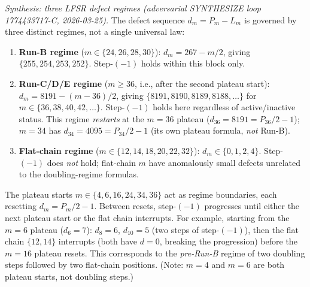 \documentclass[11pt]{article}
\theoremstyle{plain}
\theoremstyle{definition}
\begin{document}
\emph{Synthesis: three LFSR defect regimes (adversarial SYNTHESIZE loop 1774433717-C, 2026-03-25).}
The defect sequence $d_m = P_m - L_m$ is governed by three distinct regimes, not a single
universal law:
\begin{enumerate}
\item \textbf{Run-B regime} ($m\in\{24,26,28,30\}$): $d_m = 267 - m/2$, giving
  $\{255,254,253,252\}$.  Step-$(-1)$ holds within this block only.
\item \textbf{Run-C/D/E regime} ($m\geq 36$, i.e., after the second plateau start):
  $d_m = 8191 - (m-36)/2$, giving $\{8191,8190,8189,8188,\ldots\}$ for $m\in\{36,38,40,42,\ldots\}$.
  Step-$(-1)$ holds here regardless of active/inactive status.
  This regime \emph{restarts} at the $m=36$ plateau ($d_{36}=8191=P_{36}/2-1$);
  $m=34$ has $d_{34}=4095=P_{34}/2-1$ (its own plateau formula, \emph{not} Run-B).
\item \textbf{Flat-chain regime} ($m\in\{12,14,18,20,22,32\}$): $d_m\in\{0,1,2,4\}$.
  Step-$(-1)$ does \emph{not} hold; flat-chain $m$ have anomalously small defects
  unrelated to the doubling-regime formulas.
\end{enumerate}
The plateau starts $m\in\{4,6,16,24,34,36\}$ act as regime boundaries, each resetting
$d_m = P_m/2-1$.  Between resets, step-$(-1)$ progresses until either the next plateau start
or the flat chain interrupts.  For example, starting from the $m=6$ plateau ($d_6=7$):
$d_8=6$, $d_{10}=5$ (two steps of step-$(-1)$), then the flat chain $\{12,14\}$ interrupts
(both have $d=0$, breaking the progression) before the $m=16$ plateau resets.
This corresponds to the \emph{pre-Run-B} regime of two doubling steps followed by two
flat-chain positions.  (Note: $m=4$ and $m=6$ are both plateau starts, not doubling steps.)
\end{document}
